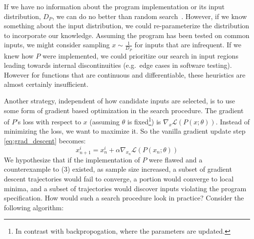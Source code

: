 \documentclass[12pt,initial,twoside,maitrise]{dms}
\numberwithin{equation}{section}
\numberwithin{table}{chapter}
\numberwithin{figure}{chapter}
\begin{document}
If we have no information about the program implementation or its input distribution, $D_P$, we can do no better than random search~\cite{wolpert1997no}. However, if we know something about the input distribution, we could re-parameterize the distribution to incorporate our knowledge. Assuming the program has been tested on common inputs, we might consider sampling $x \sim \frac{1}{D_P}$ for inputs that are infrequent. If we knew how $P$ were implemented, we could prioritize our search in input regions leading towards internal discontinuities (e.g.\ edge cases in software testing). However for functions that are continuous and differentiable, these heuristics are almost certainly insufficient.


Another strategy, independent of how candidate inputs are selected, is to use some form of gradient based optimization in the search procedure. The gradient of $P$'s loss with respect to $x$ (assuming $\theta$ is fixed\footnote{In contrast with backpropogation, where the parameters are updated.}) is $\nabla_x \mathcal{L}(P(x; \theta))$. Instead of minimizing the loss, we want to maximize it. So the vanilla gradient update step \ref{eq:grad_descent} becomes:
%
\begin{equation}
    x_{n+1}^i = x_{n}^i + \alpha \nabla_{x_n} \mathcal{L}(P(x_n; \theta))
\end{equation}
%
We hypothesize that if the implementation of $P$ were flawed and a counterexample to (3) existed, as sample size increased, a subset of gradient descent trajectories would fail to converge, a portion would converge to local minima, and a subset of trajectories would discover inputs violating the program specification. How would such a search procedure look in practice? Consider the following algorithm:

%
%
\end{document}
